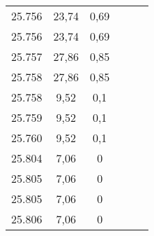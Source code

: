 \begin{tabularx}{8cm}{@{}ccc|ccc@{}}
25.756 & 23,74 & 0,69 &  &  & \\
25.756 & 23,74 & 0,69 &  &  & \\
25.757 & 27,86 & 0,85 &  &  & \\
25.758 & 27,86 & 0,85 &  &  & \\
25.758 & 9,52 & 0,1 &  &  & \\
25.759 & 9,52 & 0,1 &  &  & \\
25.760 & 9,52 & 0,1 &  &  & \\
25.804 & 7,06 & 0 &  &  & \\
25.805 & 7,06 & 0 &  &  & \\
25.805 & 7,06 & 0 &  &  & \\
25.806 & 7,06 & 0 &  &  & \\
  \bottomrule
\end{tabularx}
